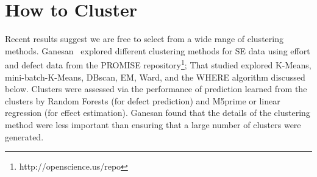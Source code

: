 \documentclass[conference]{IEEEtran}
\begin{document}
	
	\section{How to Cluster}
	Recent results suggest  we are free to select from a wide range of 
	clustering methods.  Ganesan~\cite{div14} explored 
	different clustering methods for SE data using   effort and defect data from
	the PROMISE repository\footnote{http://openscience.us/repo};
	That studied explored
	K-Means, mini-batch-K-Means, DBscan, EM, Ward, and the WHERE algorithm discussed
	below.
	Clusters were assessed via the performance of prediction 
	learned from the clusters by Random Forests (for defect prediction)
	and M5prime or linear regression (for effect estimation).  Ganesan found
	that the details of the clustering method were less important than ensuring that  a large number of clusters were generated.
	
\end{document}
